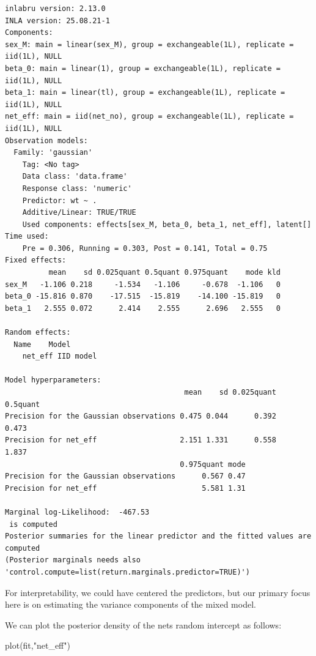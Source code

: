 \documentclass[
  letterpaper,
  DIV=11,
  numbers=noendperiod]{scrartcl}
\newenvironment{Shaded}{\begin{snugshade}}{\end{snugshade}}
\newcommand{\FunctionTok}[1]{\textcolor[rgb]{0.28,0.35,0.67}{#1}}
\newcommand{\NormalTok}[1]{\textcolor[rgb]{0.00,0.23,0.31}{#1}}
\newcommand{\StringTok}[1]{\textcolor[rgb]{0.13,0.47,0.30}{#1}}
\begin{document}
\begin{verbatim}
inlabru version: 2.13.0
INLA version: 25.08.21-1
Components:
sex_M: main = linear(sex_M), group = exchangeable(1L), replicate = iid(1L), NULL
beta_0: main = linear(1), group = exchangeable(1L), replicate = iid(1L), NULL
beta_1: main = linear(tl), group = exchangeable(1L), replicate = iid(1L), NULL
net_eff: main = iid(net_no), group = exchangeable(1L), replicate = iid(1L), NULL
Observation models:
  Family: 'gaussian'
    Tag: <No tag>
    Data class: 'data.frame'
    Response class: 'numeric'
    Predictor: wt ~ .
    Additive/Linear: TRUE/TRUE
    Used components: effects[sex_M, beta_0, beta_1, net_eff], latent[]
Time used:
    Pre = 0.306, Running = 0.303, Post = 0.141, Total = 0.75 
Fixed effects:
          mean    sd 0.025quant 0.5quant 0.975quant    mode kld
sex_M   -1.106 0.218     -1.534   -1.106     -0.678  -1.106   0
beta_0 -15.816 0.870    -17.515  -15.819    -14.100 -15.819   0
beta_1   2.555 0.072      2.414    2.555      2.696   2.555   0

Random effects:
  Name    Model
    net_eff IID model

Model hyperparameters:
                                         mean    sd 0.025quant 0.5quant
Precision for the Gaussian observations 0.475 0.044      0.392    0.473
Precision for net_eff                   2.151 1.331      0.558    1.837
                                        0.975quant mode
Precision for the Gaussian observations      0.567 0.47
Precision for net_eff                        5.581 1.31

Marginal log-Likelihood:  -467.53 
 is computed 
Posterior summaries for the linear predictor and the fitted values are computed
(Posterior marginals needs also 'control.compute=list(return.marginals.predictor=TRUE)')
\end{verbatim}

For interpretability, we could have centered the predictors, but our
primary focus here is on estimating the variance components of the mixed
model.

We can plot the posterior density of the nets random intercept as
follows:

\begin{Shaded}
\begin{Highlighting}[]
\FunctionTok{plot}\NormalTok{(fit,}\StringTok{"net\_eff"}\NormalTok{)}
\end{Highlighting}
\end{Shaded}
\end{document}
